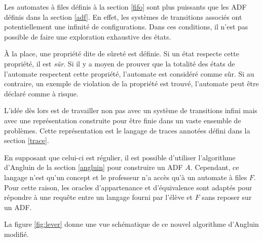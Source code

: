 Les automates à files définis à la section \ref{fifo} sont plus puissants que les ADF définis dans la section \ref{adf}. En effet, les systèmes de transitions associés ont potentiellement une infinité de configurations. Dans ces conditions, il n'est pas possible de faire une exploration exhaustive des états.

À la place, une propriété dite de sûreté est définie. Si un état respecte cette propriété, il est \emph{sûr}. Si il y a moyen de prouver que la totalité des états de l'automate respectent cette propriété, l'automate est considéré comme sûr. Si au contraire, un exemple de violation de la propriété est trouvé, l'automate peut être déclaré comme à risque.

L'idée dès lors est de travailler non pas avec un système de transitions infini mais avec une représentation construite pour être finie dans un vaste ensemble de problèmes. Cette représentation est le langage de traces annotées défini dans la section \ref{trace}.

En supposant que celui-ci est régulier, il est possible d'utiliser l'algorithme d'Angluin de la section \ref{angluin} pour construire un ADF $A$. Cependant, ce langage n'est qu'un concept et le professeur n'a accès qu'à un automate à files $F$. Pour cette raison, les oracles d'appartenance et d'équivalence sont adaptés pour répondre à une requête entre un langage fourni par l'élève et $F$ sans reposer sur un ADF.

La figure \ref{fig:lever} donne une vue schématique de ce nouvel algorithme d'Angluin modifié.


